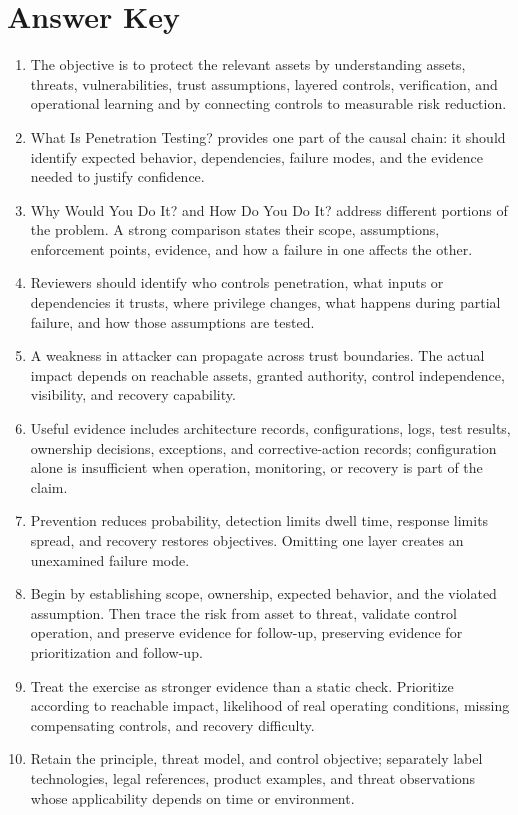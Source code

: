 \documentclass[11pt,letterpaper]{article}
\begin{document}
\section*{Answer Key}
\begin{enumerate}
\item The objective is to protect the relevant assets by understanding assets, threats, vulnerabilities, trust assumptions, layered controls, verification, and operational learning and by connecting controls to measurable risk reduction.
\item What Is Penetration Testing? provides one part of the causal chain: it should identify expected behavior, dependencies, failure modes, and the evidence needed to justify confidence.
\item Why Would You Do It? and How Do You Do It? address different portions of the problem. A strong comparison states their scope, assumptions, enforcement points, evidence, and how a failure in one affects the other.
\item Reviewers should identify who controls penetration, what inputs or dependencies it trusts, where privilege changes, what happens during partial failure, and how those assumptions are tested.
\item A weakness in attacker can propagate across trust boundaries. The actual impact depends on reachable assets, granted authority, control independence, visibility, and recovery capability.
\item Useful evidence includes architecture records, configurations, logs, test results, ownership decisions, exceptions, and corrective-action records; configuration alone is insufficient when operation, monitoring, or recovery is part of the claim.
\item Prevention reduces probability, detection limits dwell time, response limits spread, and recovery restores objectives. Omitting one layer creates an unexamined failure mode.
\item Begin by establishing scope, ownership, expected behavior, and the violated assumption. Then trace the risk from asset to threat, validate control operation, and preserve evidence for follow-up, preserving evidence for prioritization and follow-up.
\item Treat the exercise as stronger evidence than a static check. Prioritize according to reachable impact, likelihood of real operating conditions, missing compensating controls, and recovery difficulty.
\item Retain the principle, threat model, and control objective; separately label technologies, legal references, product examples, and threat observations whose applicability depends on time or environment.
\end{enumerate}
\end{document}
